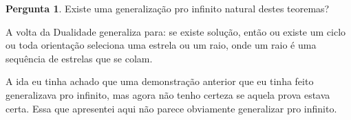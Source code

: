 \documentclass[11pt]{article}
\theoremstyle{definition}
\theoremstyle{definition}
\theoremstyle{definition}
\theoremstyle{definition}
\theoremstyle{definition}
\theoremstyle{definition}
\theoremstyle{definition}
\theoremstyle{definition}
\theoremstyle{definition}
\theoremstyle{definition}
\theoremstyle{definition}
\theoremstyle{definition}
\theoremstyle{definition}
\theoremstyle{definition}
\newtheorem{preguta}{Pergunta}
\newenvironment{pergunta}{
\definecolor{shadecolor}{HTML}{FFF8F0}
\begin{shaded}
\begin{preguta}
}
{
\end{preguta}
\end{shaded}
}
\begin{document}
\begin{pergunta}
  Existe uma generalização pro infinito natural destes teoremas?

  A volta da Dualidade generaliza para: se existe solução, então ou existe um ciclo ou toda orientação seleciona uma estrela ou um raio, onde um raio é uma sequência de estrelas que se colam.

  A ida eu tinha achado que uma demonstração anterior que eu tinha feito generalizava pro infinito, mas agora não tenho certeza se aquela prova estava certa. Essa que apresentei aqui não parece obviamente generalizar pro infinito.
\end{pergunta}



\end{document}
